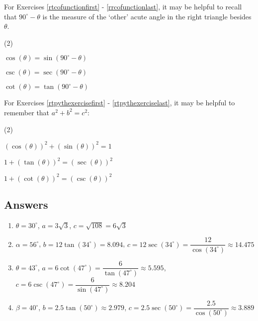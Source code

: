 For Exercises \ref{rtcofunctionfirst} - \ref{rrcofunctionlast}, it may be helpful to recall that $90^{\circ} - \theta$ is the measure of the `other' acute angle in the right triangle besides $\theta$.


\begin{tasks}[resume](2)

\task  $\cos(\theta) = \sin\left( 90^{\circ} - \theta \right) $ \label{rtcofunctionfirst} \label{cofunctionforeshadowing}

\task  $\csc(\theta) = \sec\left( 90^{\circ} - \theta \right) $

\task  $\cot(\theta) = \tan\left( 90^{\circ} - \theta \right) $ \label{rrcofunctionlast}

\end{tasks}

For Exercises \ref{rtpythexercisefirst} - \ref{rtpythexerciselast}, it may be helpful to remember that $a^2+b^2 = c^2$:

\begin{tasks}[resume](2)

\task  $(\cos(\theta))^2 + (\sin(\theta))^2 = 1$ \label{rtpythexercisefirst}

\task  $1 + (\tan(\theta))^2 = (\sec(\theta))^2$

\task  $ 1 + (\cot(\theta))^2 = (\csc(\theta))^2$ \label{rtpythexerciselast} \label{rtidentitylast}

\end{tasks}

\clearpage

\subsection{Answers}

\begin{enumerate}

\item  $\theta = 30^{\circ}$, $a = 3\sqrt{3}$, $c = \sqrt{108} = 6\sqrt{3}$

\item  $\alpha = 56^{\circ}$, $b = 12 \tan(34^{\circ}) =  8.094$, $c = 12\sec(34^{\circ}) = \dfrac{12}{\cos(34^{\circ})} \approx 14.475$

\item  $\theta = 43^{\circ}$, $a = 6\cot(47^{\circ}) = \dfrac{6}{\tan(47^{\circ})} \approx 5.595$, $c = 6\csc(47^{\circ}) = \dfrac{6}{\sin(47^{\circ})} \approx 8.204$

\item  $\beta = 40^{\circ}$, $b = 2.5 \tan(50^{\circ}) \approx 2.979$, $c = 2.5\sec(50^{\circ}) = \dfrac{2.5}{\cos(50^{\circ})} \approx 3.889$

\setcounter{HW}{\value{enumi}}

\end{enumerate}

